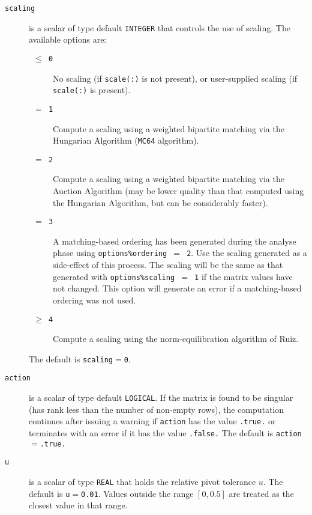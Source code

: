 \begin{description}
\item[\texttt{scaling}] is a scalar of type default {\tt INTEGER} that controls
   the use of scaling. The available
options are:
\begin{description}
   \item[\texttt{ $\le$ 0 }] No scaling (if \texttt{scale(:)} is not present),
      or user-supplied scaling (if \texttt{scale(:)} is present).
   \item[\texttt{ $=$ 1 }] Compute a scaling using a weighted bipartite matching
      via the Hungarian Algorithm (\texttt{MC64} algorithm).
   \item[\texttt{ $=$ 2 }] Compute a scaling using a weighted bipartite matching
      via the Auction Algorithm (may be lower quality than that computed using 
      the Hungarian Algorithm, but can be considerably faster).
   \item[\texttt{ $=$ 3 }] A matching-based ordering has been generated during the
      analyse phase using {\tt options\%ordering $=$ 2}. Use the
      scaling generated as a side-effect of this process. The scaling will be
      the same as that generated with {\tt options\%scaling $=$ 1} if the matrix
      values have not changed. This option will generate an error if a
      matching-based ordering was not used.
   \item[\texttt{ $\ge$ 4 }] Compute a scaling using the norm-equilibration
      algorithm of Ruiz.
\end{description}
The default is {\tt scaling}$=${\tt 0}.

\end{description}


\begin{description}
\item[\texttt{action}] is a scalar of type default {\tt LOGICAL}.
If the matrix is found to be singular (has rank less than the number of
non-empty rows), the computation continues after issuing a warning if
{\tt action} has the value {\tt .true.} or
terminates with an error if it has the value {\tt .false.}
The default is {\tt action}$=${\tt .true.}


\item[\texttt{u}] is a scalar of type {\tt REAL} that holds the relative pivot
tolerance $u$.
The default is {\tt u}$=${\tt 0.01}.
Values outside the range $[0,0.5]$ are treated as the closest value in that range.

\end{description}

